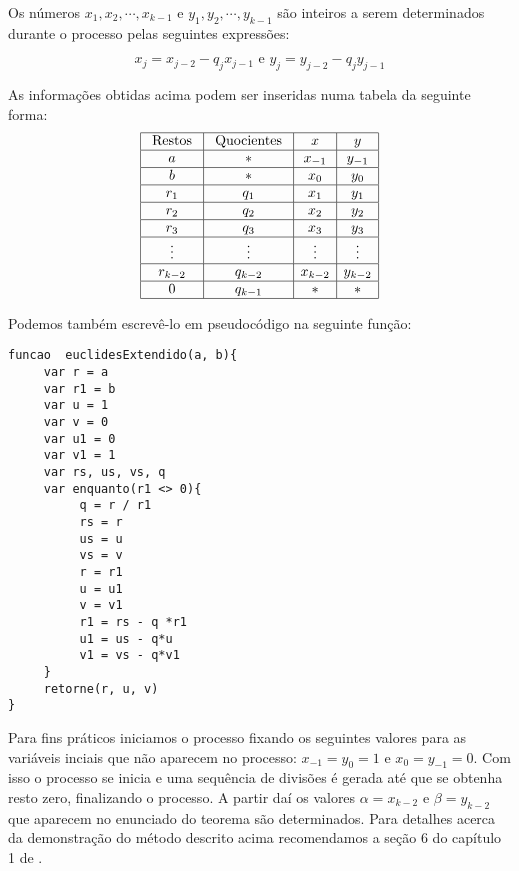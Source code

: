 Os n\'{u}meros $x_{1}, x_{2}, \cdots, x_{k-1}$ e $y_{1}, y_{2}, \cdots, y_{k-1}$ s\~{a}o inteiros a
serem determinados durante o processo pelas seguintes express\~{o}es:

$$x_{j}=x_{j-2}-q_{j}x_{j-1}\textrm{ \ \ e \ \ }  y_{j}=y_{j-2}-q_{j}y_{j-1}$$

As informa\c{c}\~{o}es obtidas acima podem ser inseridas numa tabela da seguinte forma:
\[
\begin{array}{|c|c|c|c|}\hline
\textrm{ Restos } & \textrm{ Quocientes } & x       & y \\ \hline
				a 	      & \ast     							& x_{-1}  & y_{-1} \\ \hline
				b  			  & \ast     							& x_{0}   & y_{0} \\ \hline
				r_{1}     & q_{1}   					 	  & x_{1}   & y_{1} \\ \hline
				r_{2}     & q_{2}    							& x_{2}   & y_{2} \\ \hline
				r_{3}     & q_{3}    							& x_{3}   & y_{3} \\ \hline  
				\vdots    & \vdots   							& \vdots  & \vdots \\ \hline
				r_{k-2}   & q_{k-2}  							& x_{k-2} & y_{k-2} \\ \hline
				0         & q_{k-1}  							& \ast    & \ast    \\ \hline
\end{array}
\]

Podemos tamb\'em escrev\^e-lo em pseudoc\'odigo na seguinte fun\c{c}\~ao:

\begin{verbatim}
funcao  euclidesExtendido(a, b){
     var r = a
     var r1 = b
     var u = 1
     var v = 0
     var u1 = 0
     var v1 = 1
     var rs, us, vs, q
     var enquanto(r1 <> 0){
          q = r / r1
          rs = r
          us = u
          vs = v
          r = r1
          u = u1
          v = v1
          r1 = rs - q *r1
          u1 = us - q*u
          v1 = vs - q*v1
     }
     retorne(r, u, v)
}
\end{verbatim}


Para fins pr\'{a}ticos iniciamos o processo fixando os seguintes valores para as vari\'{a}veis inciais
que n\~{a}o aparecem no processo: $x_{-1}=y_{0}=1$ e $x_{0}=y_{-1}=0$. Com isso o processo se inicia e 
uma sequ\^{e}ncia de divis\~{o}es \'{e} gerada at\'{e} que se obtenha resto zero, finalizando o processo. 
A partir da\'{i} os valores $\alpha=x_{k-2}$ e $\beta=y_{k-2}$ que aparecem no 
enunciado do teorema s\~{a}o determinados. Para detalhes acerca da demonstra\c{c}\~{a}o do m\'{e}todo descrito acima recomendamos 
a se\c{c}\~{a}o 6 do cap\'{i}tulo 1 de \cite{cou:2014}. 

